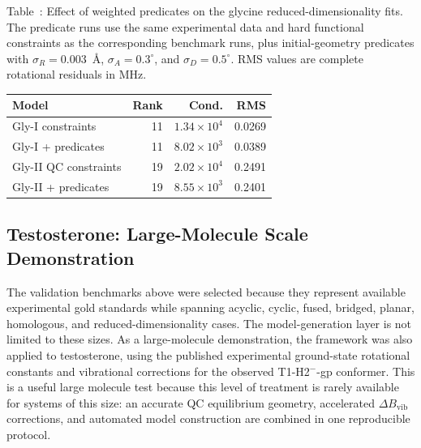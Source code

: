 \documentclass[aip,jcp,reprint,longbibliography,floatfix]{revtex4-2}
\begin{document}
\begin{center}
\label{tab:glycine-predicate-checks}
\parbox{0.94\linewidth}{\small\raggedright Table~\thetable: Effect of weighted
predicates on the glycine reduced-dimensionality fits. The predicate runs use
the same experimental data and hard functional constraints as the corresponding
benchmark runs, plus initial-geometry predicates with $\sigma_R=0.003$~\AA{},
$\sigma_A=0.3^\circ$, and $\sigma_D=0.5^\circ$. RMS values are complete
rotational residuals in MHz.\par}
\smallskip
\small
\setlength{\tabcolsep}{3pt}
\begin{tabular}{lrrr}
\toprule
Model & Rank & Cond. & RMS \\
\midrule
Gly-I constraints & 11 & $1.34\times10^4$ & 0.0269 \\
Gly-I + predicates & 11 & $8.02\times10^3$ & 0.0389 \\
Gly-II QC constraints & 19 & $2.02\times10^4$ & 0.2491 \\
Gly-II + predicates & 19 & $8.55\times10^3$ & 0.2401 \\
\bottomrule
\end{tabular}
\end{center}

\subsection{Testosterone: Large-Molecule Scale Demonstration}

The validation benchmarks above were selected because they represent available
experimental gold standards while spanning acyclic, cyclic, fused, bridged,
planar, homologous, and reduced-dimensionality cases. The model-generation
layer is not limited to these sizes. As a large-molecule demonstration, the framework was
also applied to testosterone, using the published experimental ground-state
rotational constants and vibrational corrections for the observed
T1-H2$^{-}$-gp conformer.\cite{Uribe2024SteroidHormones} This is a useful large
molecule test because this level of treatment is rarely available for systems
of this size: an accurate QC equilibrium geometry, accelerated
$\Delta B_\mathrm{vib}$ corrections, and automated model construction are
combined in one reproducible protocol.
\end{document}
